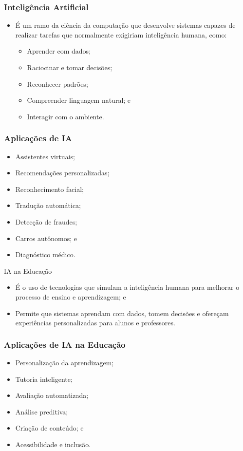 \documentclass[aspectratio=169]{beamer} %
\begin{document}
\begin{frame}
	\frametitle{Inteligência Artificial}
	
	\begin{itemize}
		\item É um ramo da ciência da computação que desenvolve sistemas capazes de realizar tarefas que normalmente exigiriam inteligência humana, como:
		\begin{itemize}
			\item Aprender com dados;
			\item Raciocinar e tomar decisões;
			\item Reconhecer padrões;
			\item Compreender linguagem natural; e
			\item Interagir com o ambiente.
		\end{itemize}
	\end{itemize}
\end{frame}

\begin{frame}
	\frametitle{Aplicações de IA}
	
	\begin{itemize}
		\item Assistentes virtuais;
		\item Recomendações personalizadas;
		\item Reconhecimento facial;
		\item Tradução automática;
		\item Detecção de fraudes;
		\item Carros autônomos; e
		\item Diagnóstico médico.
	\end{itemize}
\end{frame}

\begin{frame}{IA na Educação}
	
	\begin{itemize}
		\item É o uso de tecnologias que simulam a inteligência humana para melhorar o processo de ensino e aprendizagem; e
		\item Permite que sistemas aprendam com dados, tomem decisões e ofereçam experiências personalizadas para alunos e professores.
	\end{itemize}
\end{frame}

\begin{frame}
	\frametitle{Aplicações de IA na Educação}
	
	\begin{itemize}
		\item Personalização da aprendizagem;
		\item Tutoria inteligente;
		\item Avaliação automatizada;
		\item Análise preditiva;
		\item Criação de conteúdo; e
		\item Acessibilidade e inclusão.
	\end{itemize}
\end{frame}
\end{document}
